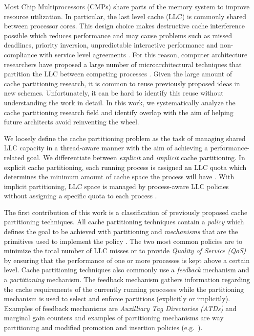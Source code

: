Most Chip Multiprocessors (CMPs) share parts of the memory system to improve resource utilization.
In particular, the last level cache (LLC) is commonly shared between processor cores.
This design choice makes destructive cache interference possible which reduces performance and may cause problems such as missed deadlines, priority inversion, unpredictable interactive performance and non-compliance with service level agreements \cite{dubois13}.
For this reason, computer architecture researchers have proposed a large number of microarchitectural techniques that partition the LLC between competing processes .
Given the large amount of cache partitioning research, it is common to reuse previously proposed ideas in new schemes.
Unfortunately, it can be hard to identify this reuse without understanding the work in detail.
In this work, we systematically analyze the cache partitioning research field and identify overlap with the aim of helping future architects avoid reinventing the wheel.

We loosely define the cache partitioning problem as the task of managing shared LLC capacity in a thread-aware manner with the aim of achieving a performance-related goal.
We differentiate between \textit{explicit} and \textit{implicit} cache partitioning.
In explicit cache partitioning, each running process is assigned an LLC quota which determines the minimum amount of cache space the process will have .
With implicit partitioning, LLC space is managed by process-aware LLC policies without assigning a specific quota to each process .

The first contribution of this work is a classification of previously proposed cache partitioning techniques.
All cache partitioning techniques contain a \textit{policy} which defines the goal to be achieved with partitioning and \textit{mechanisms} that are the primitives used to implement the policy \cite{virtualPrivateMachines}.
The two most common policies are to minimize the total number of LLC misses or to provide \textit{Quality of Service (QoS)} by ensuring that the performance of one or more processes is kept above a certain level.
Cache partitioning techniques also commonly use a \textit{feedback} mechanism and a \textit{partitioning} mechanism.
The feedback mechanism gathers information regarding the cache requirements of the currently running processes while the partitioning mechanism is used to select and enforce partitions (explicitly or implicitly).
Examples of feedback mechanisms are \textit{Auxilliary Tag Directories (ATDs)} \cite{utilityBasedCachePartitioning,haakonHiPC} and marginal gain counters \cite{dynPartofSharedCacheMemory,suh02} and examples of partitioning mechanisms are way partitioning  \cite{utilityBasedCachePartitioning} and modified promotion and insertion policies (e.g.\ \cite{xie09}).


